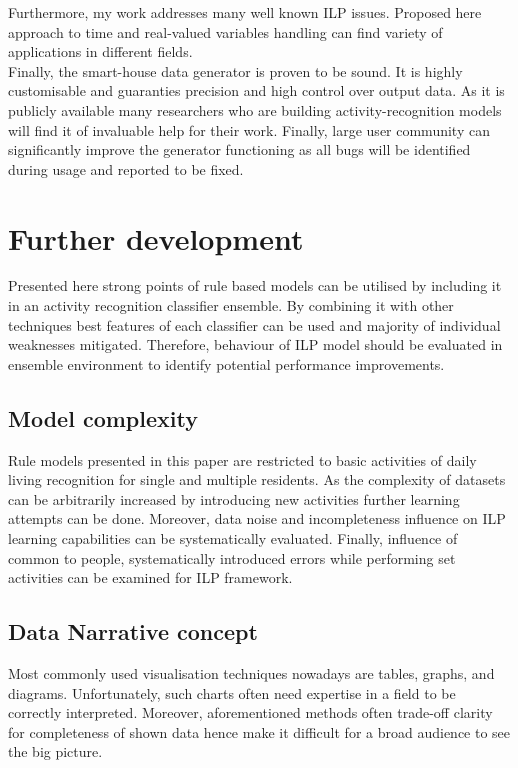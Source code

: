 \documentclass[10pt, a4paper, pdflatex, leqno, twoside, openright]{report}
\begin{document}
Furthermore, my work addresses many well known ILP issues. Proposed here approach to time and real-valued variables handling can find variety of applications in different fields.\\

Finally, the smart-house data generator is proven to be sound. It is highly customisable and guaranties precision and high control over output data. As it is publicly available many researchers who are building activity-recognition models will find it of invaluable help for their work. Finally, large user community can significantly improve the generator functioning as all bugs will be identified during usage and reported to be fixed.

  \section{Further development}
Presented here strong points of rule based models can be utilised by including it in an activity recognition classifier ensemble. By combining it with other techniques best features of each classifier can be used and majority of individual weaknesses mitigated. Therefore, behaviour of ILP model should be evaluated in ensemble environment to identify potential performance improvements.

    \subsection{Model complexity}
Rule models presented in this paper are restricted to basic activities of daily living recognition for single and multiple residents. As the complexity of datasets can be arbitrarily increased by introducing new activities further learning attempts can be done. Moreover, data noise and incompleteness influence on ILP learning capabilities can be systematically evaluated. Finally, influence of common to people, systematically introduced errors while performing set activities can be examined for ILP framework.

    \subsection{Data Narrative concept\label{sec:narrative}}
Most commonly used visualisation techniques nowadays are tables, graphs, and diagrams. Unfortunately, such charts often need expertise in a field to be correctly interpreted. Moreover, aforementioned methods often trade-off clarity for completeness of shown data hence make it difficult for a broad audience to see the big picture.\\
\end{document}
